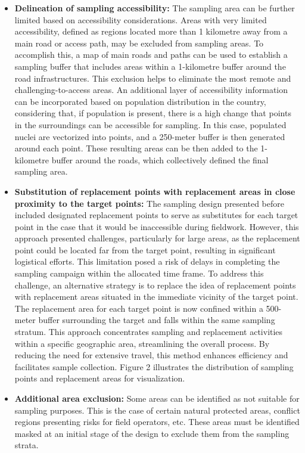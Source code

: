 \documentclass[
]{book}
\begin{document}
\begin{itemize}
\item
  \textbf{Delineation of sampling accessibility:} The sampling area can be further limited based on accessibility considerations. Areas with very limited accessibility, defined as regions located more than 1 kilometre away from a main road or access path, may be excluded from sampling areas. To accomplish this, a map of main roads and paths can be used to establish a sampling buffer that includes areas within a 1-kilometre buffer around the road infrastructures. This exclusion helps to eliminate the most remote and challenging-to-access areas. An additional layer of accessibility information can be incorporated based on population distribution in the country, considering that, if population is present, there is a high change that points in the surroundings can be accessible for sampling. In this case, populated nuclei are vectorized into points, and a 250-meter buffer is then generated around each point. These resulting areas can be then added to the 1-kilometre buffer around the roads, which collectively defined the final sampling area.
\item
  \textbf{Substitution of replacement points with replacement areas in close proximity to the target points:} The sampling design presented before included designated replacement points to serve as substitutes for each target point in the case that it would be inaccessible during fieldwork. However, this approach presented challenges, particularly for large areas, as the replacement point could be located far from the target point, resulting in significant logistical efforts. This limitation posed a risk of delays in completing the sampling campaign within the allocated time frame. To address this challenge, an alternative strategy is to replace the idea of replacement points with replacement areas situated in the immediate vicinity of the target point. The replacement area for each target point is now confined within a 500-meter buffer surrounding the target and falls within the same sampling stratum. This approach concentrates sampling and replacement activities within a specific geographic area, streamlining the overall process. By reducing the need for extensive travel, this method enhances efficiency and facilitates sample collection. Figure 2 illustrates the distribution of sampling points and replacement areas for visualization.
\item
  \textbf{Additional area exclusion:} Some areas can be identified as not suitable for sampling purposes. This is the case of certain natural protected areas, conflict regions presenting risks for field operators, etc. These areas must be identified masked at an initial stage of the design to exclude them from the sampling strata.
\end{itemize}
\end{document}
